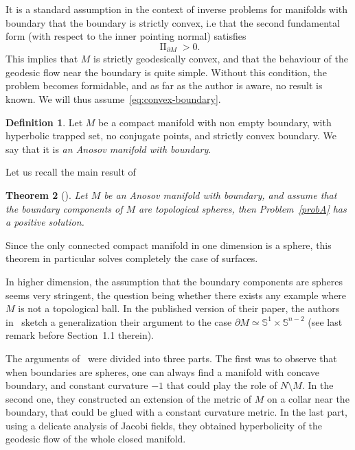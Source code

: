 \documentclass[10pt]{amsart}
\newtheorem{theo}{Theorem}[section]
\theoremstyle{definition}\newtheorem{defi}[theo]{Definition}\newtheorem{rema}[theo]{Remark}\newtheorem{exam}[theo]{Example}\newtheorem{exem}[theo]{Example}\newtheorem{nota}[theo]{Notation}
\newcommand{\Ss}{\mathbb{S}}
\DeclareMathOperator{\II}{II}
\theoremstyle{plain}
\begin{document}
It is a standard assumption in the context of inverse problems for manifolds with boundary that the boundary is strictly convex, i.e that the second fundamental form (with respect to the inner pointing normal) satisfies
\begin{equation}\label{eq:convex-boundary}
\II_{\partial M} > 0.
\end{equation}
This implies that $M$ is strictly geodesically convex, and that the behaviour of the geodesic flow near the boundary is quite simple. Without this condition, the problem becomes formidable, and as far as the author is aware, no result is known. We will thus assume~\eqref{eq:convex-boundary}.

\begin{defi}
Let $M$ be a compact manifold with non empty boundary, with hyperbolic trapped set, no conjugate points, and strictly convex boundary. We say that it is \emph{an Anosov manifold with boundary}.
\end{defi}

Let us recall the main result of~\cite{Chen-Erchenko-Gogolev}

\begin{theo}[{\cite[Theorem~A]{Chen-Erchenko-Gogolev}}]
\label{thm:1}
Let $M$ be an Anosov manifold with boundary, and assume that the boundary components of $M$ are topological spheres, then Problem~\ref{probA} has a positive solution.
\end{theo}

Since the only connected compact manifold in one dimension is a sphere, this theorem in particular solves completely the case of surfaces.

In higher dimension, the assumption that the boundary components are spheres seems very stringent, the question being whether there exists any example where $M$ is not a topological ball. In the published version of their paper, the authors in~\cite{Chen-Erchenko-Gogolev} sketch a generalization their argument to the case $\partial M \simeq \Ss^1 \times \Ss^{n-2}$ (see last remark before Section~1.1 therein).

The arguments of~\cite{Chen-Erchenko-Gogolev} were divided into three parts. The first was to observe that when boundaries are spheres, one can always find a manifold with concave boundary, and constant curvature $-1$ that could play the role of $N\setminus M$. In the second one, they constructed an extension of the metric of $M$ on a collar near the boundary, that could be glued with a constant curvature metric. In the last part, using a delicate analysis of Jacobi fields, they obtained hyperbolicity of the geodesic flow of the whole closed manifold.
\end{document}
